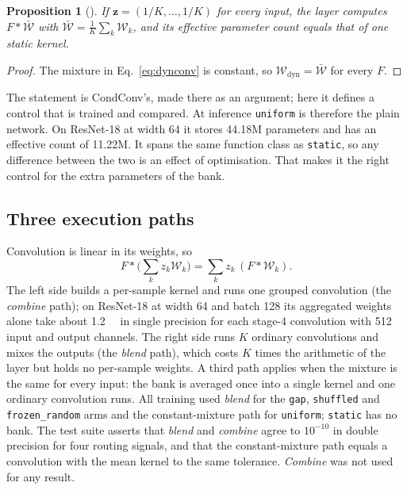 \documentclass[10pt,a4paper]{article}
\newtheorem{proposition}{Proposition}
\newcommand{\zv}{\mathbf{z}}
\begin{document}
\begin{proposition}[{\citealp[Section 3]{yang2019condconv}}]\label{prop:collapse}
If $\zv=(1/K,\dots,1/K)$ for every input, the layer computes
$F*\bar{\mathcal{W}}$ with $\bar{\mathcal{W}}=\tfrac1K\sum_k\mathcal{W}_k$,
and its effective parameter count equals that of one static kernel.
\end{proposition}
\begin{proof}
The mixture in Eq.~\eqref{eq:dynconv} is constant, so
$\mathcal{W}_{\text{dyn}}=\bar{\mathcal{W}}$ for every $F$.
\end{proof}

The statement is CondConv's, made there as an argument; here it defines a
control that is trained and compared. At inference \texttt{uniform} is
therefore the plain network. On
ResNet-18 at width 64 it stores 44.18M parameters and has an effective
count of 11.22M. It spans the same function class as \texttt{static}, so
any difference between the two is an effect of optimisation. That makes it
the right control for the extra parameters of the bank.

\subsection{Three execution paths}

Convolution is linear in its weights, so
\begin{equation}
F*\Big(\sum_k z_k\mathcal{W}_k\Big)=\sum_k z_k\,(F*\mathcal{W}_k).
\label{eq:lin}
\end{equation}
The left side builds a per-sample kernel and runs one grouped convolution
(the \emph{combine} path); on ResNet-18 at width 64 and batch 128 its
aggregated weights alone take about \SI{1.2}{\giga\byte} in single
precision for each stage-4 convolution with 512 input and output channels.
The right side runs $K$ ordinary convolutions and mixes the outputs (the
\emph{blend} path), which costs $K$ times the arithmetic of the layer but
holds no per-sample weights. A third path applies when the mixture is the
same for every input: the bank is averaged once into a single kernel and
one ordinary convolution runs. All training used \emph{blend} for the
\texttt{gap}, \texttt{shuffled} and \texttt{frozen\_random} arms and the
constant-mixture path for \texttt{uniform}; \texttt{static} has no bank.
The test suite asserts that \emph{blend} and \emph{combine} agree to
$10^{-10}$ in double precision for four routing signals, and that the
constant-mixture path equals a convolution with the mean kernel to the same
tolerance. \emph{Combine} was not used for any result.
\end{document}

